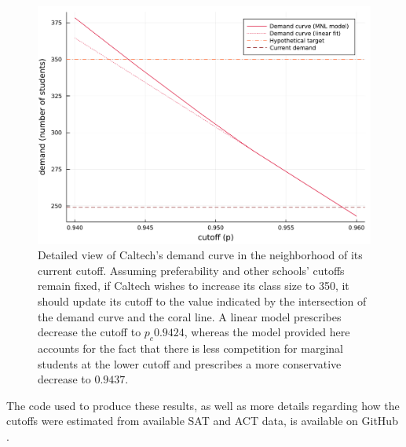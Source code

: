 \documentclass[12pt]{article}
\theoremstyle{definition}
\begin{document}
\begin{figure}
\begin{center}\includegraphics[width=\linewidth, ]{plots/caltech-demand-curve.pdf}\end{center}
\captionsetup{singlelinecheck=off}
    \caption[.]{Detailed view of Caltech's demand curve in the neighborhood of its current cutoff. Assuming preferability and other schools' cutoffs remain fixed, if Caltech wishes to increase its class size to 350, it should update its cutoff to the value indicated by the intersection of the demand curve and the coral line. A linear model prescribes decrease the cutoff to $p_c 0.9424$, whereas the model provided here accounts for the fact that there is less competition for marginal students at the lower cutoff and prescribes a more conservative decrease to $0.9437$. }
\label{caltech-demand-curve}
\end{figure}








The code used to produce these results, as well as more details regarding how the cutoffs were estimated from available SAT and ACT data, is available on GitHub \parencite[][]{studentprefsrevopt}.
\end{document}
